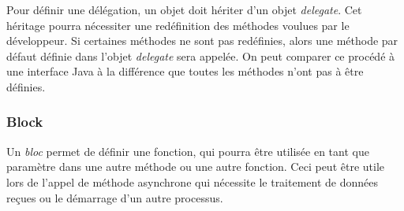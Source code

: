 Pour définir une délégation, un objet doit hériter d'un objet \textit{delegate}. Cet héritage pourra nécessiter une redéfinition des méthodes voulues par le développeur. Si certaines méthodes ne sont pas redéfinies, alors une méthode par défaut définie dans l'objet \textit{delegate} sera appelée. On peut comparer ce procédé à une interface Java à la différence que toutes les méthodes n'ont pas à être définies.

\subsubsection{Block}

Un \textit{bloc} permet de définir une fonction, qui pourra être utilisée en tant que paramètre dans une autre méthode ou une autre fonction. Ceci peut être utile lors de l'appel de méthode asynchrone qui nécessite le traitement de données reçues ou le démarrage d'un autre processus.